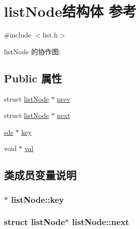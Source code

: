 \hypertarget{structlistNode}{}\section{list\+Node结构体 参考}
\label{structlistNode}


{\ttfamily \#include $<$list.\+h$>$}



list\+Node 的协作图\+:
\subsection*{Public 属性}
\begin{DoxyCompactItemize}
\item 
struct \hyperlink{structlistNode}{list\+Node} $\ast$ \hyperlink{structlistNode_a79259218e5b958028b7e650d48d3cb01}{prev}
\item 
struct \hyperlink{structlistNode}{list\+Node} $\ast$ \hyperlink{structlistNode_a860785ea27fb1c044d6a59ba491dd6ab}{next}
\item 
\hyperlink{structsds}{sds} $\ast$ \hyperlink{structlistNode_a57e7b77da03461adfd381f23cbaf502e}{key}
\item 
void $\ast$ \hyperlink{structlistNode_adb310bc734d6abb046a3b72b9ca9b684}{val}
\end{DoxyCompactItemize}


\subsection{类成员变量说明}
\subsubsection[{\texorpdfstring{key}{key}}]{$\ast$ list\+Node\+::key}\hypertarget{structlistNode_a57e7b77da03461adfd381f23cbaf502e}{}\label{structlistNode_a57e7b77da03461adfd381f23cbaf502e}
\subsubsection[{\texorpdfstring{next}{next}}]{\setlength{\rightskip}{0pt plus 5cm}struct {\bf list\+Node}$\ast$ list\+Node\+::next}\hypertarget{structlistNode_a860785ea27fb1c044d6a59ba491dd6ab}{}\label{structlistNode_a860785ea27fb1c044d6a59ba491dd6ab}
